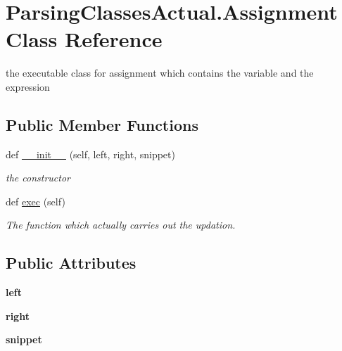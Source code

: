 \hypertarget{class_parsing_classes_actual_1_1_assignment}{}\section{Parsing\+Classes\+Actual.\+Assignment Class Reference}
\label{class_parsing_classes_actual_1_1_assignment}


the executable class for assignment which contains the variable and the expression  


\subsection*{Public Member Functions}
\begin{DoxyCompactItemize}
\item 
def \hyperlink{class_parsing_classes_actual_1_1_assignment_ad1ed51f09df9ee3ca193e0a5f6646c11}{\+\_\+\+\_\+init\+\_\+\+\_\+} (self, left, right, snippet)
\begin{DoxyCompactList}\small\item\em the constructor \end{DoxyCompactList}\item 
\mbox{\label{class_parsing_classes_actual_1_1_assignment_ad9d41c2aca94f42213fed890eb33aa44}} 
def \hyperlink{class_parsing_classes_actual_1_1_assignment_ad9d41c2aca94f42213fed890eb33aa44}{exec} (self)
\begin{DoxyCompactList}\small\item\em The function which actually carries out the updation. \end{DoxyCompactList}\end{DoxyCompactItemize}
\subsection*{Public Attributes}
\begin{DoxyCompactItemize}
\item 
\mbox{\label{class_parsing_classes_actual_1_1_assignment_ae9e7a7861ee3c433563e3ffb84e96136}} 
{\bfseries left}
\item 
\mbox{\label{class_parsing_classes_actual_1_1_assignment_a47a5c7ff174dac880264b4bcac0cdb4c}} 
{\bfseries right}
\item 
\mbox{\label{class_parsing_classes_actual_1_1_assignment_aafc31dddf6dfff65459ef199c7c6b829}} 
{\bfseries snippet}
\end{DoxyCompactItemize}


